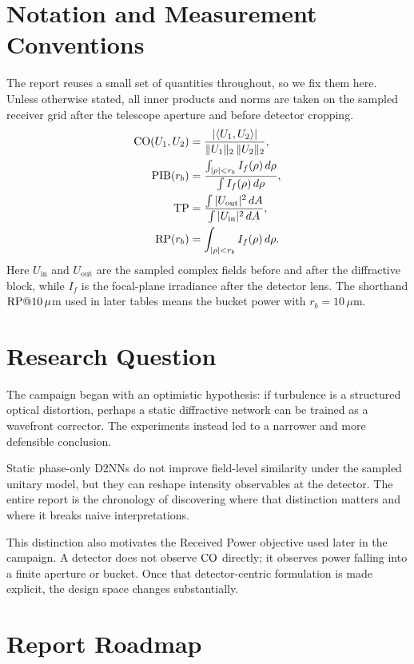 \section{Notation and Measurement Conventions}

The report reuses a small set of quantities throughout, so we fix them here.
Unless otherwise stated, all inner products and norms are taken on the sampled
receiver grid after the telescope aperture and before detector cropping.
\begin{align}
\mathrm{CO}(U_1,U_2)
&=
\frac{|\langle U_1,U_2\rangle|}{\|U_1\|_2\,\|U_2\|_2},\\
\mathrm{PIB}(r_b)
&=
\frac{\int_{|\rho|<r_b} I_f(\rho)\,d\rho}{\int I_f(\rho)\,d\rho},\\
\mathrm{TP}
&=
\frac{\int |U_{\mathrm{out}}|^2\,dA}{\int |U_{\mathrm{in}}|^2\,dA},\\
\mathrm{RP}(r_b)
&=
\int_{|\rho|<r_b} I_f(\rho)\,d\rho .
\end{align}
Here $U_{\mathrm{in}}$ and $U_{\mathrm{out}}$ are the sampled complex fields
before and after the diffractive block, while $I_f$ is the focal-plane
irradiance after the detector lens. The shorthand $\RP@10\,\mu$m used in later
tables means the bucket power with $r_b=10\,\mu$m.

\section{Research Question}

The campaign began with an optimistic hypothesis: if turbulence is a structured
optical distortion, perhaps a static diffractive network can be trained as a
wavefront corrector. The experiments instead led to a narrower and more
defensible conclusion.

\begin{keyinsight}
Static phase-only D2NNs do not improve field-level similarity under the sampled
unitary model, but they can reshape intensity observables at the detector. The
entire report is the chronology of discovering where that distinction matters
and where it breaks naive interpretations.
\end{keyinsight}

This distinction also motivates the Received Power objective used later in the
campaign. A detector does not observe $\mathrm{CO}$ directly; it observes power falling
into a finite aperture or bucket. Once that detector-centric formulation is
made explicit, the design space changes substantially.

\section{Report Roadmap}

